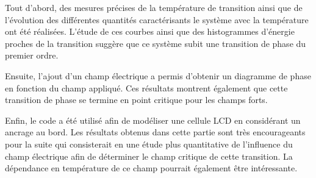 \documentclass[11pt,a4paper]{article}
\numberwithin{equation}{section}
\begin{document}
Tout d'abord, des mesures précises de la température de transition ainsi que de l'évolution des différentes quantités caractérisants le système avec la température ont été réalisées. L'étude de ces courbes ainsi que des histogrammes d'énergie proches de la transition suggère que ce système subit une transition de phase du premier ordre.
\medskip

Ensuite, l'ajout d'un champ électrique a permis d'obtenir un diagramme de phase en fonction du champ appliqué. Ces résultats montrent également que cette transition de phase se termine en point critique pour les champs forts.
\medskip

Enfin, le code a été utilisé afin de modéliser une cellule LCD en considérant un ancrage au bord. Les résultats obtenus dans cette partie sont très encourageants pour la suite qui consisterait en une étude plus quantitative de l'influence du champ électrique afin de déterminer le champ critique de cette transition. La dépendance en température de ce champ pourrait également être intéressante.


 
\end{document}
